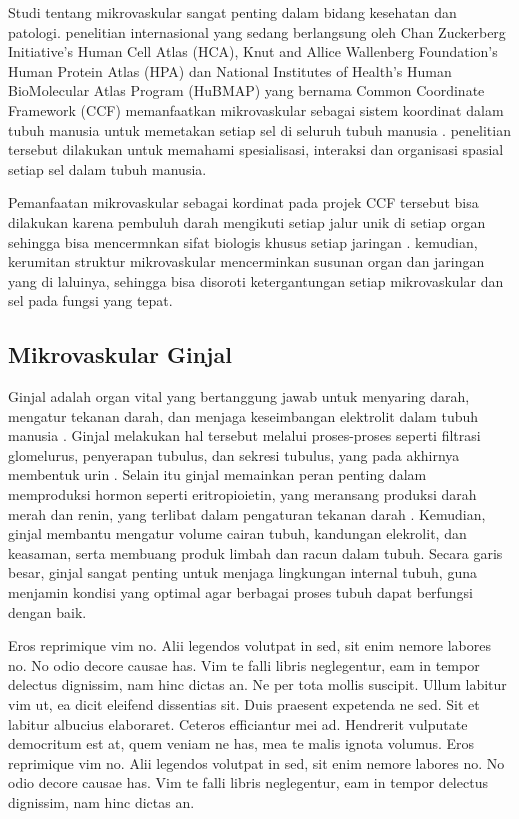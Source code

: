 \noindent Studi tentang mikrovaskular sangat penting dalam bidang kesehatan dan patologi. penelitian internasional yang sedang berlangsung oleh Chan Zuckerberg Initiative's Human Cell Atlas (HCA), Knut and Allice Wallenberg Foundation's Human Protein Atlas (HPA) dan National Institutes of Health's Human BioMolecular Atlas Program (HuBMAP) yang bernama Common Coordinate Framework (CCF) memanfaatkan mikrovaskular sebagai sistem koordinat dalam tubuh manusia untuk memetakan setiap sel di seluruh tubuh manusia \cite{weber_considerations_2020}. penelitian tersebut dilakukan untuk memahami spesialisasi, interaksi dan organisasi spasial setiap sel dalam tubuh manusia.

\noindent Pemanfaatan mikrovaskular sebagai kordinat pada projek CCF tersebut bisa dilakukan karena pembuluh darah  mengikuti setiap jalur unik di setiap organ sehingga bisa mencermnkan sifat biologis khusus setiap jaringan \cite{weber_considerations_2020}. kemudian, kerumitan struktur mikrovaskular mencerminkan susunan organ dan jaringan yang di laluinya, sehingga bisa disoroti ketergantungan setiap mikrovaskular dan sel pada fungsi yang tepat. 



\subsection{Mikrovaskular Ginjal}
\noindent Ginjal adalah organ vital yang bertanggung jawab untuk menyaring darah, mengatur tekanan darah, dan menjaga keseimbangan elektrolit dalam tubuh manusia \cite{ito_s-27-1_2023,bagarao_renal_2023}. %
 Ginjal melakukan hal tersebut melalui proses-proses seperti filtrasi glomelurus, penyerapan tubulus, dan sekresi tubulus, yang pada akhirnya membentuk urin \cite{auctores_publishing_llc_what_2021}. Selain itu ginjal memainkan peran penting dalam memproduksi hormon seperti eritropioietin, yang meransang produksi darah merah dan renin, yang terlibat dalam pengaturan tekanan darah \cite{scannali_s-22-6_2023}. Kemudian, ginjal membantu mengatur volume cairan tubuh, kandungan elekrolit, dan keasaman, serta membuang produk limbah dan racun dalam tubuh. Secara garis besar, ginjal sangat penting untuk menjaga lingkungan internal tubuh, guna menjamin kondisi yang optimal agar berbagai proses tubuh dapat berfungsi dengan baik.

\noindent

Eros reprimique vim no. Alii legendos volutpat in sed, sit enim nemore labores no. No odio decore causae has. Vim te falli libris neglegentur, eam in tempor delectus dignissim, nam hinc dictas an. Ne per tota mollis suscipit. Ullum labitur vim ut, ea dicit eleifend dissentias sit. Duis praesent expetenda ne sed. Sit et labitur albucius elaboraret. Ceteros efficiantur mei ad. Hendrerit vulputate democritum est at, quem veniam ne has, mea te malis ignota volumus. Eros reprimique vim no. Alii legendos volutpat in sed, sit enim nemore labores no. No odio decore causae has. Vim te falli libris neglegentur, eam in tempor delectus dignissim, nam hinc dictas an.

